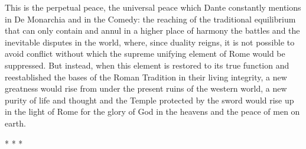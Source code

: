 This is the perpetual peace, the universal peace which Dante constantly mentions in De Monarchia and in the Comedy: the reaching of the traditional equilibrium that can only contain and annul in a higher place of harmony the battles and the inevitable disputes in the world, where, since duality reigns, it is not possible to avoid conflict without which the supreme unifying element of Rome would be suppressed. But instead, when this element is restored to its true function and reestablished the bases of the Roman Tradition in their living integrity, a new greatness would rise from under the present ruins of the western world, a new purity of life and thought and the Temple protected by the sword would rise up in the light of Rome for the glory of God in the heavens and the peace of men on earth.


\hfill




\begin{center}* * *\end{center}

